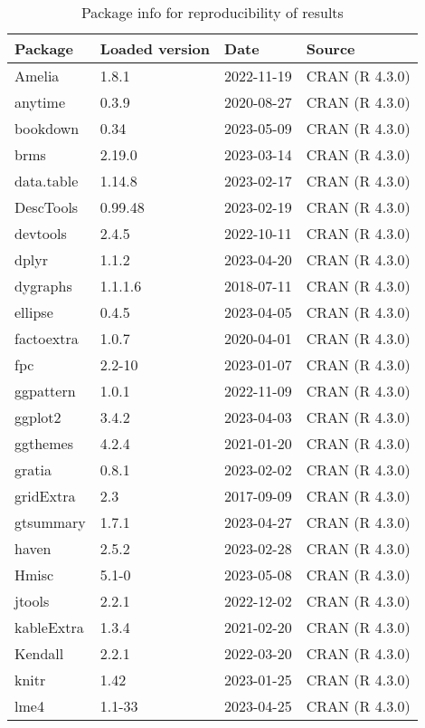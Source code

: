 \documentclass[
]{article}
\begin{document}
\begin{table}

\caption{\label{tab:Reproducibility-sessionInfo-R-packages}Package info for reproducibility of results}
\centering
\begin{tabular}[t]{llll}
\toprule
Package & Loaded version & Date & Source\\
\midrule
Amelia & 1.8.1 & 2022-11-19 & CRAN (R 4.3.0)\\
anytime & 0.3.9 & 2020-08-27 & CRAN (R 4.3.0)\\
bookdown & 0.34 & 2023-05-09 & CRAN (R 4.3.0)\\
brms & 2.19.0 & 2023-03-14 & CRAN (R 4.3.0)\\
data.table & 1.14.8 & 2023-02-17 & CRAN (R 4.3.0)\\
\addlinespace
DescTools & 0.99.48 & 2023-02-19 & CRAN (R 4.3.0)\\
devtools & 2.4.5 & 2022-10-11 & CRAN (R 4.3.0)\\
dplyr & 1.1.2 & 2023-04-20 & CRAN (R 4.3.0)\\
dygraphs & 1.1.1.6 & 2018-07-11 & CRAN (R 4.3.0)\\
ellipse & 0.4.5 & 2023-04-05 & CRAN (R 4.3.0)\\
\addlinespace
factoextra & 1.0.7 & 2020-04-01 & CRAN (R 4.3.0)\\
fpc & 2.2-10 & 2023-01-07 & CRAN (R 4.3.0)\\
ggpattern & 1.0.1 & 2022-11-09 & CRAN (R 4.3.0)\\
ggplot2 & 3.4.2 & 2023-04-03 & CRAN (R 4.3.0)\\
ggthemes & 4.2.4 & 2021-01-20 & CRAN (R 4.3.0)\\
\addlinespace
gratia & 0.8.1 & 2023-02-02 & CRAN (R 4.3.0)\\
gridExtra & 2.3 & 2017-09-09 & CRAN (R 4.3.0)\\
gtsummary & 1.7.1 & 2023-04-27 & CRAN (R 4.3.0)\\
haven & 2.5.2 & 2023-02-28 & CRAN (R 4.3.0)\\
Hmisc & 5.1-0 & 2023-05-08 & CRAN (R 4.3.0)\\
\addlinespace
jtools & 2.2.1 & 2022-12-02 & CRAN (R 4.3.0)\\
kableExtra & 1.3.4 & 2021-02-20 & CRAN (R 4.3.0)\\
Kendall & 2.2.1 & 2022-03-20 & CRAN (R 4.3.0)\\
knitr & 1.42 & 2023-01-25 & CRAN (R 4.3.0)\\
lme4 & 1.1-33 & 2023-04-25 & CRAN (R 4.3.0)\\

\end{tabular}
\end{table}
\end{document}
